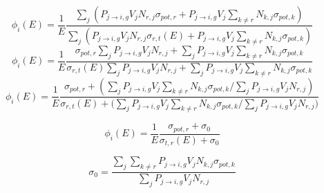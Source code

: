 \documentclass{beamer}
\begin{document}
    \begin{frame}
\begin{equation*}\phi_{i}(E)=\frac{1}{E}\frac{\sum\limits_j\left(P_{j\rightarrow i,g}V_{j}N_{r,j}\sigma_{pot,r}+P_{j\rightarrow i,g}V_{j}\sum\limits_{k\neq r}N_{k,j}\sigma_{pot,k}\right)}{\sum\limits_{j}\left(P_{j\rightarrow i,g}V_{j}N_{r,j}\sigma_{r,t}(E)+P_{j\rightarrow i,g}V_{j}\sum\limits_{k\neq r}N_{k,j}\sigma_{pot,k}\right)}\end{equation*}
\begin{equation*}\phi_{i}(E)=\frac{1}{E}\frac{\sigma_{pot,r}\sum\limits_jP_{j\rightarrow i,g}V_{j}N_{r,j}+\sum\limits_jP_{j\rightarrow i,g}V_{j}\sum\limits_{k\neq r}N_{k,j}\sigma_{pot,k}}{\sigma_{r,t}(E)\sum\limits_{j}P_{j\rightarrow i,g}V_{j}N_{r,j}+\sum\limits_{j}P_{j\rightarrow i,g}V_{j}\sum\limits_{k\neq r}N_{k,j}\sigma_{pot,k}}\end{equation*}
\begin{equation*}\phi_{i}(E)=\frac{1}{E}\frac{\sigma_{pot,r}+\left(\sum\limits_jP_{j\rightarrow i,g}V_{j}\sum\limits_{k\neq r}N_{k,j}\sigma_{pot,k}\Big/\sum\limits_jP_{j\rightarrow i,g}V_{j}N_{r,j}\right)}{\sigma_{r,t}(E)+\Big(\sum\limits_{j}P_{j\rightarrow i,g}V_{j}\sum\limits_{k\neq r}N_{k,j}\sigma_{pot,k}\Big/\sum\limits_{j}P_{j\rightarrow i,g}V_{j}N_{r,j}\Big)}\end{equation*}



    \end{frame}



    \begin{frame}
\begin{equation*}\phi_i(E)=\frac{1}{E}\frac{\sigma_{pot,r}+\sigma_{0}}{\sigma_{t,r}(E)+\sigma_{0}}\end{equation*}

\begin{equation*}\sigma_{0}=\frac{\sum\limits_j\sum\limits_{k\neq r}P_{j\rightarrow i,g}V_{j}N_{k,j}\sigma_{pot,k}}{\sum\limits_jP_{j\rightarrow i,g}V_{j}N_{r,j}}\end{equation*}

\end{frame}
\end{document}

